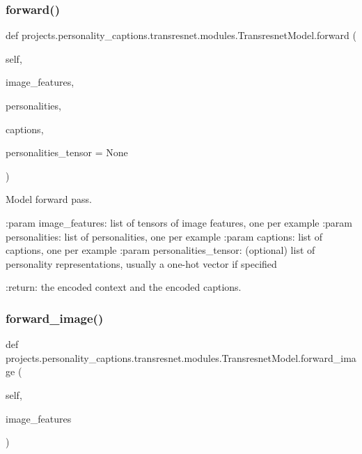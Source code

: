 \subsubsection{\texorpdfstring{forward()}{forward()}}
{\footnotesize\ttfamily def projects.\+personality\+\_\+captions.\+transresnet.\+modules.\+Transresnet\+Model.\+forward (\begin{DoxyParamCaption}\item[{}]{self,  }\item[{}]{image\+\_\+features,  }\item[{}]{personalities,  }\item[{}]{captions,  }\item[{}]{personalities\+\_\+tensor = {\ttfamily None} }\end{DoxyParamCaption})}

\begin{DoxyVerb}Model forward pass.

:param image_features:
    list of tensors of image features, one per example
:param personalities:
    list of personalities, one per example
:param captions:
    list of captions, one per example
:param personalities_tensor:
    (optional) list of personality representations, usually a one-hot
    vector if specified

:return:
    the encoded context and the encoded captions.
\end{DoxyVerb}
 \mbox{\label{classprojects_1_1personality__captions_1_1transresnet_1_1modules_1_1TransresnetModel_aee5f9d98e2c82024cc76dd1227c63f9e}} 
\subsubsection{\texorpdfstring{forward\+\_\+image()}{forward\_image()}}
{\footnotesize\ttfamily def projects.\+personality\+\_\+captions.\+transresnet.\+modules.\+Transresnet\+Model.\+forward\+\_\+image (\begin{DoxyParamCaption}\item[{}]{self,  }\item[{}]{image\+\_\+features }\end{DoxyParamCaption})}

